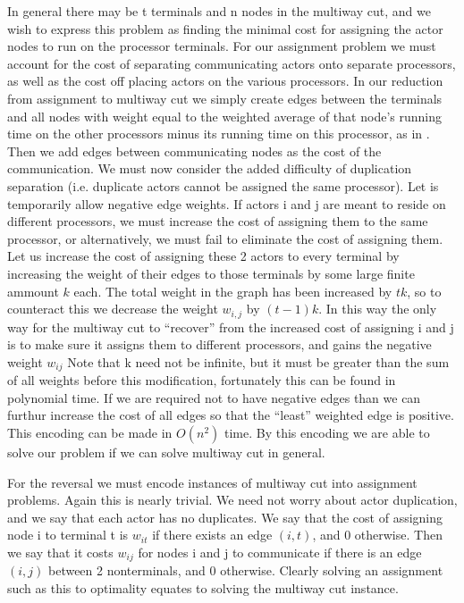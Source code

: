 \documentclass{article}
\begin{document}
In general there may be t terminals and n nodes in the multiway cut, and we wish to express this problem as finding the minimal cost for assigning the actor nodes to run on the processor terminals.
For our assignment problem we must account for the cost of separating communicating actors onto separate processors, as well as the cost off placing actors on the various processors.
In our reduction from assignment to multiway cut we simply create edges between the terminals and all nodes with weight equal to the weighted average of that node's running time on the other processors minus its running time on this processor, as in \cite{sto77}.
Then we add edges between communicating nodes as the cost of the communication.
We must now consider the added difficulty of duplication separation (i.e. duplicate actors cannot be assigned the same processor).
Let is temporarily allow negative edge weights.
If actors i and j are meant to reside on different processors, we must increase the cost of assigning them to the same processor, or alternatively, we must fail to eliminate the cost of assigning them.
Let us increase the cost of assigning these 2 actors to every terminal by increasing the weight of their edges to those terminals by some large finite ammount $k$ each.
The total weight in the graph has been increased by $tk$, so to counteract this we decrease the weight $w_{i,j}$ by $(t-1)k$.
In this way the only way for the multiway cut to ``recover'' from the increased cost of assigning i and j is to make sure it assigns them to different processors, and gains the negative weight $w_{ij}$
Note that k need not be infinite, but it must be greater than the sum of all weights before this modification, fortunately this can be found in polynomial time.
If we are required not to have negative edges than we can furthur increase the cost of all edges so that the ``least'' weighted edge is positive.
This encoding can be made in $O(n^2)$ time.
By this encoding we are able to solve our problem if we can solve multiway cut in general.

For the reversal we must encode instances of multiway cut into assignment problems.
Again this is nearly trivial.
We need not worry about actor duplication, and we say that each actor has no duplicates.
We say that the cost of assigning node i to terminal t is $w_{it}$ if there exists an edge $(i,t)$, and 0 otherwise.
Then we say that it costs $w_{ij}$ for nodes i and j to communicate if there is an edge $(i,j)$ between 2 nonterminals, and 0 otherwise.
Clearly solving an assignment such as this to optimality equates to solving the multiway cut instance.
\end{document}
